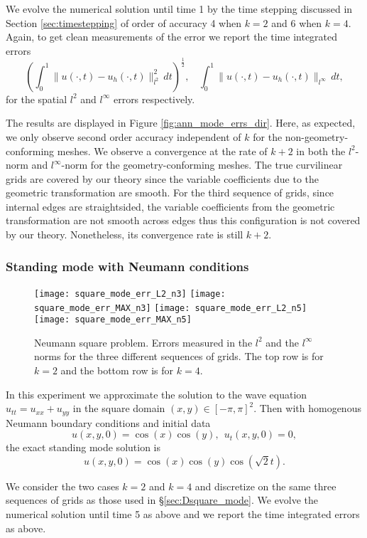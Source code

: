 \documentclass[onefignum,onetabnum]{siamart171218}
\begin{document}
We evolve the numerical solution until time 1 by the time stepping discussed in Section \ref{sec:timestepping} of order of accuracy 4 when $k=2$ and 6 when $k=4$. Again, to get clean measurements of the error we report the time integrated errors 
\[
\left(\int_0^{1} \|u(\cdot,t) - u_h(\cdot,t)\|^2_{l^2} \, dt \right)^{\frac{1}{2}}, \ \ \ \ \int_0^{1} \|u(\cdot,t) - u_h(\cdot,t)\|_{l^\infty} \, dt,
\]
for the spatial $l^2$ and $l^\infty$ errors respectively. 

The results are displayed in Figure \ref{fig:ann_mode_errs_dir}. Here, as expected, we only observe second order accuracy independent of $k$ for the non-geometry-conforming meshes. We observe a convergence at the rate of $k+2$ in both the $l^2$-norm and $l^\infty$-norm for the geometry-conforming meshes.   
 The true curvilinear grids are covered by our theory since the variable coefficients due to the geometric transformation are smooth. For the third sequence of grids, since internal edges are straightsided,
the variable coefficients from the geometric transformation are not smooth across edges thus this configuration is not covered by our theory. Nonetheless, its convergence rate is still $k+2$.  

\subsubsection{Standing mode with Neumann conditions} \label{sec:square_mode}
\begin{figure}[htb]
\begin{center}
\texttt{[image: square\_mode\_err\_L2\_n3]}
\texttt{[image: square\_mode\_err\_MAX\_n3]}
\texttt{[image: square\_mode\_err\_L2\_n5]}
\texttt{[image: square\_mode\_err\_MAX\_n5]}
\caption{Neumann square problem. Errors measured in the $l^2$ and the $l^\infty$ norms for the three different sequences of grids. The top row is for $k=2$ and the bottom row is for $k=4$. \label{fig:square_mode_errs}}
\end{center}
\end{figure}	
In this experiment we approximate the solution to the wave equation   $u_{tt}=u_{xx}+u_{yy}$   in the square domain $(x,y) \in [-\pi,\pi]^2$. Then with homogenous Neumann boundary conditions and initial data 
\[
u(x,y,0) = \cos (x) \cos(y), \ \ u_t(x,y,0) = 0,
\] 
the exact standing mode solution is
\[
u(x,y,0) = \cos (x) \cos(y) \cos(\sqrt{2}t).
\]

We consider the two cases $k = 2$ and $k=4$ and discretize on the same three sequences of grids as those used in \S \ref{sec:Dsquare_mode}. We evolve the numerical solution until time 5 as above and we report the time integrated errors as above. 
\end{document}
